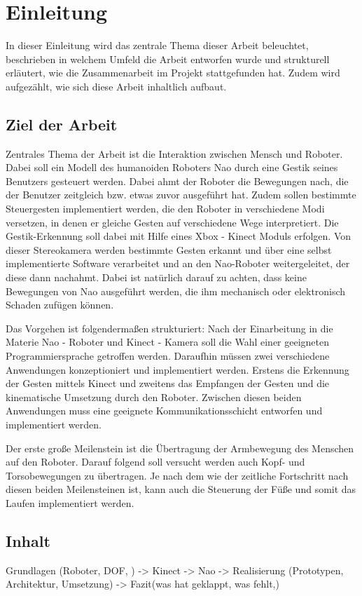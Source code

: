 \chapter{Einleitung}      %

In dieser Einleitung wird das zentrale Thema dieser Arbeit beleuchtet, beschrieben in welchem Umfeld die Arbeit entworfen wurde und strukturell erläutert, wie die Zusammenarbeit im Projekt stattgefunden hat. Zudem wird aufgezählt, wie sich diese Arbeit inhaltlich aufbaut.

\section{Ziel der Arbeit}
Zentrales Thema der Arbeit ist die Interaktion zwischen Mensch und Roboter. Dabei soll ein Modell des humanoiden Roboters Nao durch eine Gestik seines Benutzers gesteuert werden. Dabei ahmt der Roboter die Bewegungen nach, die der Benutzer zeitgleich bzw. etwas zuvor ausgeführt hat. Zudem sollen bestimmte Steuergesten implementiert werden, die den Roboter in verschiedene Modi versetzen, in denen er gleiche Gesten auf verschiedene Wege interpretiert. Die Gestik-Erkennung soll dabei mit Hilfe eines Xbox - Kinect Moduls erfolgen. Von dieser Stereokamera werden bestimmte Gesten erkannt und über eine selbst implementierte Software verarbeitet und an den Nao-Roboter weitergeleitet, der diese dann nachahmt. Dabei ist natürlich darauf zu achten, dass keine Bewegungen von Nao ausgeführt werden, die ihm mechanisch oder elektronisch Schaden zufügen können.

Das Vorgehen ist folgendermaßen strukturiert: Nach der Einarbeitung in die Materie Nao - Roboter und Kinect - Kamera soll die Wahl einer geeigneten Programmiersprache getroffen werden. Daraufhin müssen zwei verschiedene Anwendungen konzeptioniert und implementiert werden. Erstens die Erkennung der Gesten mittels Kinect und zweitens das Empfangen der Gesten und die kinematische Umsetzung durch den Roboter. Zwischen diesen beiden Anwendungen muss eine geeignete Kommunikationsschicht entworfen und implementiert werden.

Der erste große Meilenstein ist die Übertragung der Armbewegung des Menschen auf den Roboter. Darauf folgend soll versucht werden auch Kopf- und Torsobewegungen zu übertragen. Je nach dem wie der zeitliche Fortschritt nach diesen beiden Meilensteinen ist, kann auch die Steuerung der Füße und somit das Laufen implementiert werden.

\section{Inhalt}
Grundlagen (Roboter, DOF, ) -> Kinect -> Nao -> Realisierung (Prototypen, Architektur, Umsetzung) -> Fazit(was hat geklappt, was fehlt,)

